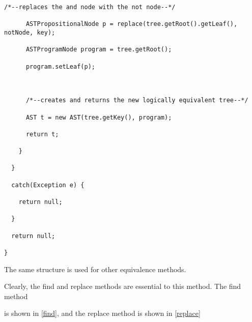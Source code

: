 \documentclass{report}
\begin{document}
\begin{lstlisting}[caption=Example of an equivalence method, label=equiveg]
      /*--replaces the and node with the not node--*/

      ASTPropositionalNode p = replace(tree.getRoot().getLeaf(), notNode, key);

      ASTProgramNode program = tree.getRoot();

      program.setLeaf(p);



      /*--creates and returns the new logically equivalent tree--*/

      AST t = new AST(tree.getKey(), program);

      return t;

    }

  }

  catch(Exception e) {

    return null;

  }

  return null;

}

\end{lstlisting}



The same structure is used for other equivalence methods.



Clearly, the find and replace methods are essential to this method. The find method

is shown in \ref{find}, and the replace method is shown in \ref{replace}
\end{document}
